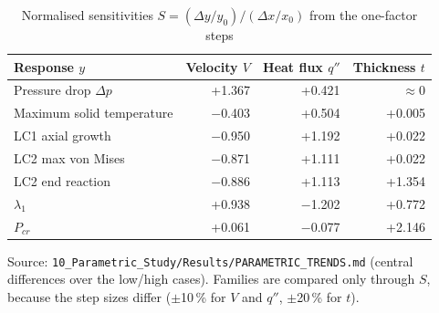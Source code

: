 \begin{table}[htbp]
\centering
\footnotesize
\caption{Normalised sensitivities $S = (\Delta y/y_0)/(\Delta x/x_0)$ from the one-factor steps}
\label{tab:psens}
\begin{tabular}{lrrr}
\toprule
Response $y$ & Velocity $V$ & Heat flux $q''$ & Thickness $t$ \\
\midrule
Pressure drop $\Delta p$ & +1.367 & +0.421 & $\approx 0$ \\
Maximum solid temperature & $-$0.403 & +0.504 & +0.005 \\
LC1 axial growth & $-$0.950 & +1.192 & +0.022 \\
LC2 max von Mises & $-$0.871 & +1.111 & +0.022 \\
LC2 end reaction & $-$0.886 & +1.113 & +1.354 \\
$\lambda_1$ & +0.938 & $-$1.202 & +0.772 \\
$P_{cr}$ & +0.061 & $-$0.077 & +2.146 \\
\bottomrule
\end{tabular}
\par\smallskip\parbox{\linewidth}{\footnotesize\raggedright Source: \texttt{10\_Parametric\_Study/Results/PARAMETRIC\_TRENDS.md} (central differences over the low/high cases). Families are compared only through $S$, because the step sizes differ ($\pm$10\,\% for $V$ and $q''$, $\pm$20\,\% for $t$).}
\end{table}
